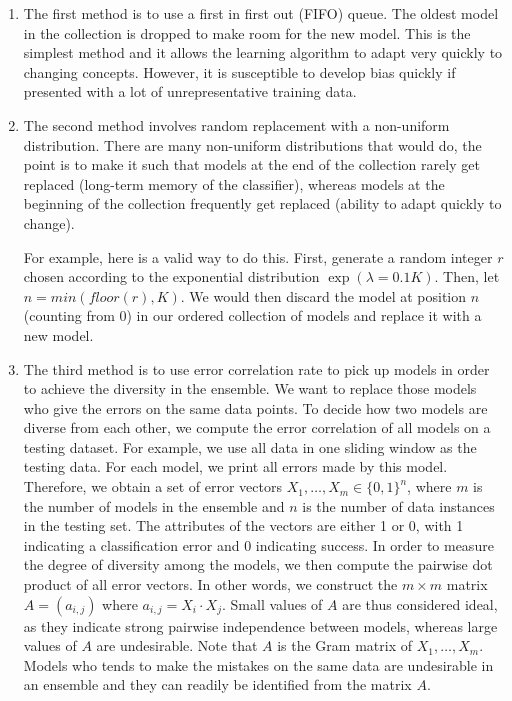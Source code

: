 \documentclass[conference]{IEEEtran}
\begin{document}
		\begin{enumerate}
			\item The first method is to use a first in first out (FIFO) queue. The oldest model in the collection is dropped to make room for the new model. This is the simplest method and it allows the learning algorithm to adapt very quickly to changing concepts. However, it is susceptible to develop bias quickly if presented with a lot of unrepresentative training data.
			
			\item The second method involves random replacement with a non-uniform distribution. There are many non-uniform distributions that would do, the point is to make it such that models at the end of the collection rarely get replaced (long-term memory of the classifier), whereas models at the beginning of the collection frequently get replaced (ability to adapt quickly to change).
			
			For example, here is a valid way to do this. First, generate a random integer $r$ chosen according to the exponential distribution $\exp(\lambda = 0.1 K)$. Then, let $n = min(floor(r), K)$. We would then discard the model at position $n$ (counting from 0) in our ordered collection of models and replace it with a new model.
			
			\item The third method is to use error correlation rate to pick up models in order to achieve the diversity in the ensemble. We want to replace those models who give the errors on the same data points. To decide how two models are diverse from each other, we compute the error correlation of all models on a testing dataset. For example, we use all data in one sliding window as the testing data. For each model, we print all errors made by this model. Therefore, we obtain a set of error vectors $X_1, \ldots, X_m \in \{0,1\}^n$, where $m$ is the number of models in the ensemble and $n$ is the number of data instances in the testing set. The attributes of the vectors are either 1 or 0, with 1 indicating a classification error and 0 indicating success. In order to measure the degree of diversity among the models, we then compute the pairwise dot product of all error vectors. In other words, we construct the $m \times m$ matrix $A = (a_{i,j})$ where $a_{i,j} = X_i \cdot X_j$. Small values of $A$ are thus considered ideal, as they indicate strong pairwise independence between models, whereas large values of $A$ are undesirable. Note that $A$ is the Gram matrix of $X_1, \ldots, X_m$. Models who tends to make the mistakes on the same data are undesirable in an ensemble \cite{Dietterich} and they can readily be identified from the matrix $A$.
		\end{enumerate}
		
\end{document}
